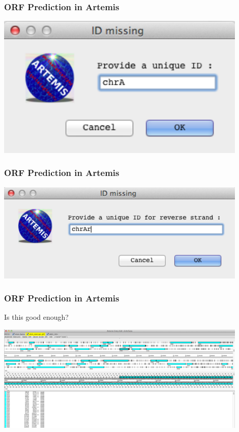 \documentclass[table]{beamer}
\begin{document}
    \begin{frame}
      \frametitle{ORF Prediction in Artemis}    
      \begin{center}
        \includegraphics[width=0.9\textwidth]{images/artemis_orf2}     
      \end{center}
    \end{frame}

    \begin{frame}
      \frametitle{ORF Prediction in Artemis}    
      \begin{center}
        \includegraphics[width=0.9\textwidth]{images/artemis_orf3}     
      \end{center}
    \end{frame}

    \begin{frame}
      \frametitle{ORF Prediction in Artemis} 
      Is this good enough?
      \begin{center}
        \includegraphics[width=0.9\textwidth]{images/artemis_orf4}     
      \end{center}
    \end{frame}
\end{document}

